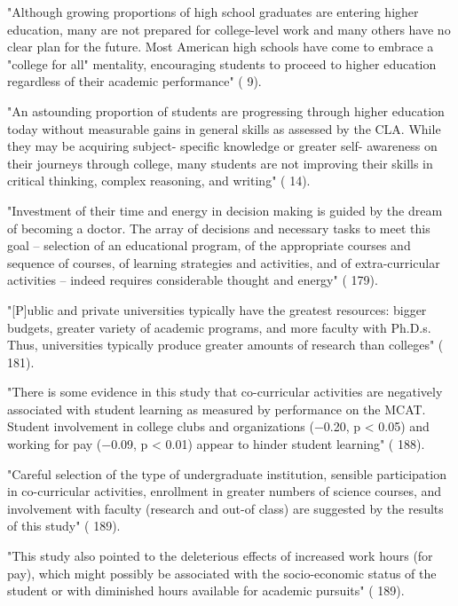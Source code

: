 
"Although growing proportions of high school graduates are entering higher education, many are not prepared for college-level work and many others have no clear plan for the future. Most American high schools have come to embrace a "college for all" mentality, encouraging students to proceed to higher education regardless of their academic performance" (\cite{Arum-2011} 9).


"An astounding proportion of students are progressing through higher education today without measurable gains in general skills as assessed by the CLA. While they may be acquiring subject- specific knowledge or greater self- awareness on their journeys through college, many students are not improving their skills in critical thinking, complex reasoning, and writing" (\cite{Arum-2011} 14).


"Investment of their time and energy in decision making is guided by the dream of becoming a doctor. The array of decisions and necessary tasks to meet this goal – selection of an educational program, of the appropriate courses and sequence of courses, of learning strategies and activities, and of extra-curricular activities – indeed requires considerable thought and energy" (\cite{Anaya-2001} 179).

"[P]ublic and private universities typically have the greatest resources: bigger budgets, greater variety of academic programs, and more faculty with Ph.D.s. Thus, universities typically produce greater amounts of research than colleges" (\cite{Anaya-2001} 181).

"There is some evidence in this study that co-curricular activities are negatively associated with student learning as measured by performance on the MCAT. Student involvement in college clubs and organizations (−0.20, p < 0.05) and working for pay (−0.09, p < 0.01) appear to hinder student learning" (\cite{Anaya-2001} 188).

"Careful selection of the type of undergraduate institution, sensible participation in co-curricular activities, enrollment in greater numbers of science courses, and involvement with faculty (research and out-of class) are suggested by the results of this study" (\cite{Anaya-2001} 189).

"This study also pointed to the deleterious effects of increased work hours (for pay), which might possibly be associated with the socio-economic status of the student or with diminished hours available for academic pursuits" (\cite{Anaya-2001} 189).


